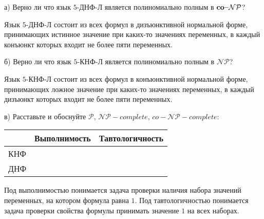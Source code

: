 \documentclass[a4paper,12pt]{article}
\begin{document}
\begin{tasknum}{3}
	а) Верно ли что язык $5$-ДНФ-Л является полиномиально полным в ${\mathbf{\text{\textbf{co--}}\mathcal{NP}}}$?
	
	Язык $5$-ДНФ-Л состоит из всех формул в дизъюнктивной нормальной форме, принимающих истинное значение при каких-то значениях переменных, в каждый конъюнкт которых входит не более пяти переменных. 
	
	б) Верно ли что язык $5$-КНФ-Л является полиномиально полным в $\mathcal{NP}$?
	
	Язык $5$-КНФ-Л состоит из всех формул в конъюнктивной нормальной форме, принимающих  ложное значение при каких-то значениях переменных, в каждый дизъюнкт которых входит не более пяти переменных.
	
	
	\smallskip
	
	в) Расставьте и обоснуйте $\mathcal{P}$, $\mathcal{NP}-complete$, $co-\mathcal{NP}-complete$: 
	\begin{center}
		\begin{tabular}{|c|c|c|}
			\hline
			& Выполнимость & Тавтологичность \\
			\hline
			КНФ &  &  \\
			\hline
			ДНФ  &   &  \\
			\hline
		\end{tabular}
	\end{center}
	
	Под выполнимостью понимается задача проверки наличия набора значений переменных, на котором формула равна $1$. Под тавтологичностью понимается задача проверки свойства формулы принимать значение $1$ на всех наборах.
\end{tasknum}
\end{document}
